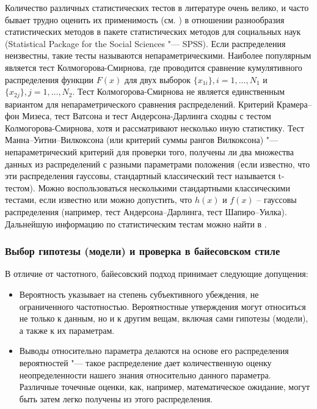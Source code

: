 Количество различных статистических тестов в литературе очень велико, и часто бывает трудно оценить их применимость 
(см. \cite{field2013discovering, wagner2019using}) в отношении разнообразия статистических методов в пакете 
статистических методов для социальных наук (Statistical Package for the Social Sciences "--- SPSS). Если распределения 
неизвестны, такие тесты называются непараметрическими. Наиболее популярным является тест Колмогорова-Смирнова, где 
проводится сравнение кумулятивного распределения функции $F(x)$ для двух выборок $\{x_{1i}\}, i = 1, \ldots, N_1$ и 
$\{x_{2j}\}, j = 1, \ldots, N_2$. Тест Колмогорова-Смирнова не является единственным вариантом для непараметрического 
сравнения распределений. Критерий Крамера–фон Мизеса, тест Ватсона и тест Андерсона-Дарлинга сходны с тестом 
Колмогорова-Смирнова, хотя и рассматривают несколько иную статистику. Тест Манна–Уитни–Вилкоксона (или критерий 
суммы рангов Вилкоксона) "--- непараметрический критерий для проверки того, получены ли два множества данных из 
распределений с разными параметрами положения (если известно, что эти распределения гауссовы, стандартный классический 
тест называется t-тестом). Можно воспользоваться несколькими стандартными классическими тестами, если известно или 
можно допустить, что $h(x)$ и $f(x)$ – гауссовы распределения (например, тест Андерсона–Дарлинга, тест Шапиро–Уилка). 
Дальнейшую информацию по статистическим тестам можно найти в \cite{ivezic2019statistics, field2013discovering, 
wagner2019using}.

\subsubsection{Выбор гипотезы (модели) и проверка в байесовском стиле}\label{sect1_2_2_2}

В отличие от частотного, байесовский подход принимает следующие допущения:
\begin{itemize}
    \item Вероятность указывает на степень субъективного убеждения, не ограниченного частотностью. Вероятностные 
        утверждения могут относиться не только к данным, но и к другим вещам, включая сами гипотезы (модели), а также к 
        их параметрам.
    \item Выводы относительно параметра делаются на основе его распределения вероятностей "--- такое распределение 
        дает количественную оценку неопределенности нашего знания относительно данного параметра. Различные точечные 
        оценки, как, например, математическое ожидание, могут быть затем легко получены из этого распределения.
\end{itemize}

